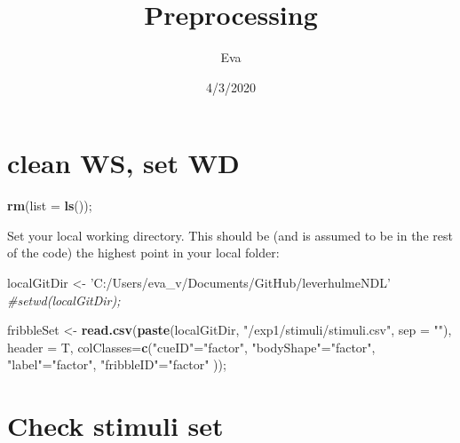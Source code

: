 \documentclass[
]{article}
\title{Preprocessing}
\author{Eva}
\date{4/3/2020}
\newenvironment{Shaded}{\begin{snugshade}}{\end{snugshade}}
\newcommand{\CommentTok}[1]{\textcolor[rgb]{0.56,0.35,0.01}{\textit{#1}}}
\newcommand{\DataTypeTok}[1]{\textcolor[rgb]{0.13,0.29,0.53}{#1}}
\newcommand{\KeywordTok}[1]{\textcolor[rgb]{0.13,0.29,0.53}{\textbf{#1}}}
\newcommand{\NormalTok}[1]{#1}
\newcommand{\StringTok}[1]{\textcolor[rgb]{0.31,0.60,0.02}{#1}}
\begin{document}
\maketitle

{
\setcounter{tocdepth}{2}
\tableofcontents
}
\hypertarget{clean-ws-set-wd}{%
\section{clean WS, set WD}\label{clean-ws-set-wd}}

\begin{Shaded}
\begin{Highlighting}[]
\KeywordTok{rm}\NormalTok{(}\DataTypeTok{list =} \KeywordTok{ls}\NormalTok{());}
\end{Highlighting}
\end{Shaded}

Set your local working directory. This should be (and is assumed to be
in the rest of the code) the highest point in your local folder:

\begin{Shaded}
\begin{Highlighting}[]
\NormalTok{localGitDir <-}\StringTok{ 'C:/Users/eva_v/Documents/GitHub/leverhulmeNDL'}
\CommentTok{#setwd(localGitDir);}
\end{Highlighting}
\end{Shaded}

\begin{Shaded}
\begin{Highlighting}[]
\NormalTok{fribbleSet <-}\StringTok{ }\KeywordTok{read.csv}\NormalTok{(}\KeywordTok{paste}\NormalTok{(localGitDir, }\StringTok{"/exp1/stimuli/stimuli.csv"}\NormalTok{, }\DataTypeTok{sep =} \StringTok{""}\NormalTok{), }
                       \DataTypeTok{header =}\NormalTok{ T,}
                       \DataTypeTok{colClasses=}\KeywordTok{c}\NormalTok{(}\StringTok{"cueID"}\NormalTok{=}\StringTok{"factor"}\NormalTok{,}
                        \StringTok{"bodyShape"}\NormalTok{=}\StringTok{"factor"}\NormalTok{,}
                        \StringTok{"label"}\NormalTok{=}\StringTok{"factor"}\NormalTok{,}
                        \StringTok{"fribbleID"}\NormalTok{=}\StringTok{"factor"}
\NormalTok{                        ));}
\end{Highlighting}
\end{Shaded}

\hypertarget{check-stimuli-set}{%
\section{Check stimuli set}\label{check-stimuli-set}}
\end{document}
